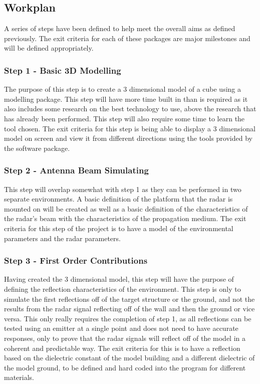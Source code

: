 \subsection{Workplan}
A series of steps have been defined to help meet the overall aims as defined previously. The exit criteria for each of these packages are major milestones and will be defined appropriately.

\subsubsection{Step 1 - Basic 3D Modelling}
The purpose of this step is to create a 3 dimensional model of a cube using a modelling package. This step will have more time built in than is required as it also includes some research on the best technology to use, above the research that has already been performed. This step will also require some time to learn the tool chosen. The exit criteria for this step is being able to display a 3 dimensional model on screen and view it from different directions using the tools provided by the software package. 

\subsubsection{Step 2 - Antenna Beam Simulating}
This step will overlap somewhat with step 1 as they can be performed in two separate environments. A basic definition of the platform that the radar is mounted on will be created as well as a basic definition of the characteristics of the radar's beam with the characteristics of the propagation medium. The exit criteria for this step of the project is to have a model of the environmental parameters and the radar parameters.

\subsubsection{Step 3 - First Order Contributions}
Having created the 3 dimensional model, this step will have the purpose of defining the reflection characteristics of the environment. This step is only to simulate the first reflections off of the target structure or the ground, and not the results from the radar signal reflecting off of the wall and then the ground or vice versa. This only really requires the completion of step 1, as all reflections can be tested using an emitter at a single point and does not need to have accurate responses, only to prove that the radar signals will reflect off of the model in a coherent and predictable way. The exit criteria for this is to have a reflection based on the dielectric constant of the model building and a different dielectric of the model ground, to be defined and hard coded into the program for different materials.

